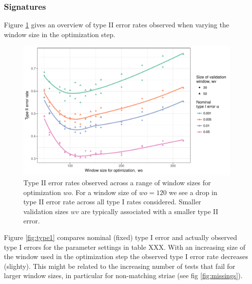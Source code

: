 \documentclass[12pt]{article}
\begin{document}
\begin{table}[!h]
\centering
{}
\end{table}

\subsubsection{Signatures}\label{signatures-1}

Figure \ref{fig:type2} gives an overview of type II error rates observed
when varying the window size in the optimization step.

\begin{figure}

{\centering \includegraphics[width=\textwidth]{figures/type2-1} 

}

\caption{Type II error rates observed across a range of window sizes for optimization $wo$. For a window size of $wo = 120$ we see a drop in type II error rate across all type I rates considered. Smaller validation sizes $wv$ are typically associated with a smaller type II error.}\label{fig:type2}
\end{figure}

Figure \ref{fig:type1} compares nominal (fixed) type I error and
actually observed type I errors for the parameter settings in table XXX.
With an increasing size of the window used in the optimization step the
observed type I error rate decreases (slighty). This might be related to
the increasing number of tests that fail for larger window sizes, in
particular for non-matching striae (see fig \ref{fig:missings}).
\end{document}
